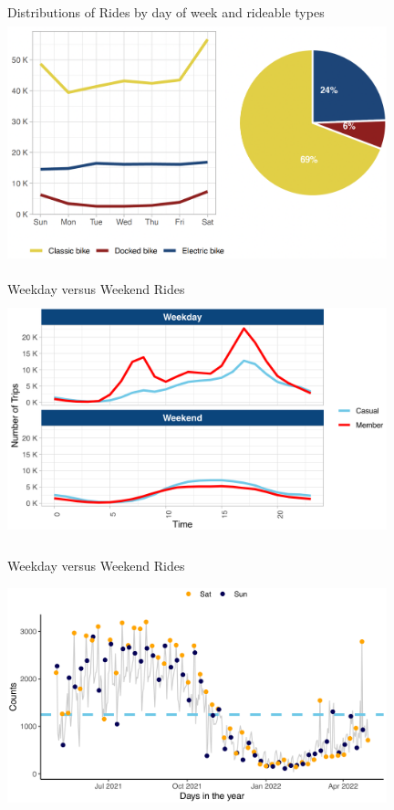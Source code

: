 \documentclass[11pt, xcolor=dvipsnames]{beamer}
\begin{document}
	\begin{frame}{Distributions of Rides by day of week and rideable types}
	\centering
	\includegraphics[width=11cm, height=7cm]{images/rideable-dayofweek}
	
\end{frame}
 	
   	\begin{frame}{Weekday versus Weekend Rides}
   	\centering
   	\includegraphics[width=11cm, height=7cm]{images/weekday-weekend}
   	
   \end{frame}

 	\begin{frame}{Weekday versus Weekend Rides}
	\centering
	\includegraphics[width=11cm, height=7cm]{images/daily-year}
	
\end{frame}
\end{document}

